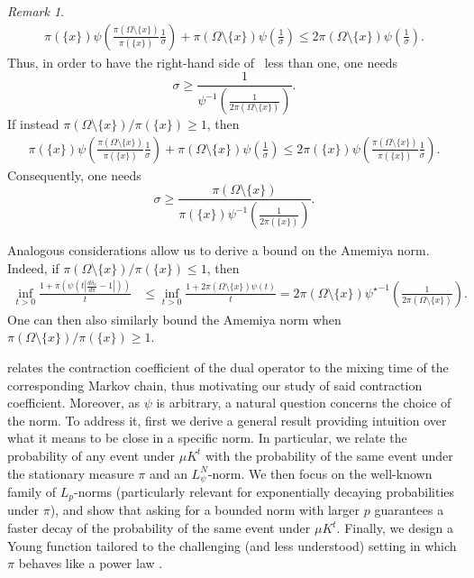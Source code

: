 \documentclass[11pt]{article}
\theoremstyle{plain}
\theoremstyle{remark}
\newtheorem{remark}{Remark}
\begin{document}
\begin{remark}
    \begin{align}
        \pi(\{x\})\psi\left(\frac{\pi(\Omega\setminus\{x\})}{ \pi(\{x\})}\frac1\sigma\right)+\pi(\Omega\setminus\{x\})\psi\left(\frac1\sigma\right) \leq 2\pi(\Omega\setminus\{x\})\psi\left(\frac1\sigma\right).\label{eq:maxLuxNormDiscrete1}
    \end{align}
    Thus, in order to have the right-hand side of~ less than one, one needs $$\sigma \geq \frac{1}{\psi^{-1}\left(\frac{1}{2\pi(\Omega\setminus\{x\})}\right)}.$$ If instead $\pi(\Omega\setminus\{x\})/\pi(\{x\}) \geq 1$, then  %
     \begin{align}
        \pi(\{x\})\psi\left(\frac{\pi(\Omega\setminus\{x\})}{ \pi(\{x\})}\frac1\sigma\right)+\pi(\Omega\setminus\{x\})\psi\left(\frac1\sigma\right) \leq 2\pi(\{x\})\psi\left(\frac{\pi(\Omega\setminus\{x\})}{ \pi(\{x\})}\frac1\sigma\right)\label{eq:maxLuxNormDiscrete2}.
    \end{align}
    Consequently, one needs $$\sigma \geq \frac{\pi(\Omega\setminus\{x\})}{ \pi(\{x\})\psi^{-1}\left(\frac{1}{2\pi(\{x\})}\right)}.$$
   
    Analogous considerations allow us to derive a bound on the Amemiya norm. Indeed, if $\pi(\Omega\setminus\{x\})/\pi(\{x\}) \leq 1$, then
    \begin{align}
        \inf_{t>0} \frac{1+\pi\left(\psi\left(t\left|\frac{d\delta_x}{d\pi}-1\right|\right)\right)}{t} &\leq   \inf_{t>0} \frac{1+2\pi(\Omega\setminus\{x\}) \psi(t)}{t} = 2\pi(\Omega\setminus\{x\}) {\psi^{\star}}^{-1}\left(\frac{1}{2\pi(\Omega\setminus\{x\})}\right).
    \end{align}
    One can then also similarly bound the Amemiya norm when $\pi(\Omega\setminus\{x\})/\pi(\{x\}) \geq 1$.

    \end{remark}
    relates the contraction coefficient of the dual operator to the mixing time of the corresponding Markov chain, thus motivating our study of said contraction coefficient. 
    Moreover, as %
    $\psi$ is arbitrary, a natural question concerns the choice of the norm. %
    To address it, first we %
    derive a general result providing intuition over what it means to be close in a specific norm. In particular, we relate the probability of any event under $\mu K^t$ with the probability of the same event under the stationary measure $\pi$ and an $L^{N}_\psi$-norm. We then focus on the well-known family of $L_p$-norms (particularly relevant for exponentially decaying probabilities under $\pi$), and show that asking for a bounded norm with larger $p$ guarantees a faster decay of the probability of the same event under $\mu K^t$. Finally, we design a Young function tailored to the challenging (and less understood) setting in which $\pi$ behaves like a power law \cite{polynomialMC}. %
\end{document}
